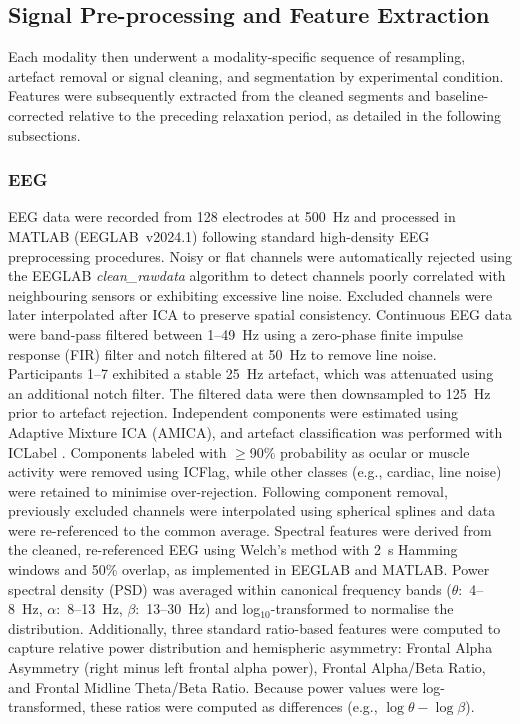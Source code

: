 \documentclass[lettersize,journal]{IEEEtran}
\begin{document}
\subsection{Signal Pre-processing and Feature Extraction}
Each modality then underwent a modality-specific sequence of resampling, artefact removal or signal cleaning, and segmentation by experimental condition. Features were subsequently extracted from the cleaned segments and baseline-corrected relative to the preceding relaxation period, as detailed in the following subsections.

\subsubsection{EEG}
EEG data were recorded from 128 electrodes at 500~Hz and processed in MATLAB (EEGLAB~v2024.1) following standard high-density EEG preprocessing procedures. Noisy or flat channels were automatically rejected using the EEGLAB \textit{clean\_rawdata} algorithm to detect channels poorly correlated with neighbouring sensors or exhibiting excessive line noise. Excluded channels were later interpolated after ICA to preserve spatial consistency. Continuous EEG data were band-pass filtered between 1--49~Hz using a zero-phase finite impulse response (FIR) filter and notch filtered at 50~Hz to remove line noise. Participants 1--7 exhibited a stable 25~Hz artefact, which was attenuated using an additional notch filter. The filtered data were then downsampled to 125~Hz prior to artefact rejection. Independent components were estimated using Adaptive Mixture ICA (AMICA), and artefact classification was performed with ICLabel \cite{pion-tonachiniICLabelAutomatedElectroencephalographic2019}. Components labeled with $\geq$90\% probability as ocular or muscle activity were removed using ICFlag, while other classes (e.g., cardiac, line noise) were retained to minimise over-rejection. Following component removal, previously excluded channels were interpolated using spherical splines and data were re-referenced to the common average. Spectral features were derived from the cleaned, re-referenced EEG using Welch’s method with 2~s Hamming windows and 50\% overlap, as implemented in EEGLAB and MATLAB. Power spectral density (PSD) was averaged within canonical frequency bands ($\theta$:~4--8~Hz, $\alpha$:~8--13~Hz, $\beta$:~13--30~Hz) and log$_{10}$-transformed to normalise the distribution. Additionally, three standard ratio-based features were computed to capture relative power distribution and hemispheric asymmetry: Frontal Alpha Asymmetry (right minus left frontal alpha power), Frontal Alpha/Beta Ratio, and Frontal Midline Theta/Beta Ratio. Because power values were log-transformed, these ratios were computed as differences (e.g., $\log \theta - \log \beta$). 
\end{document}
